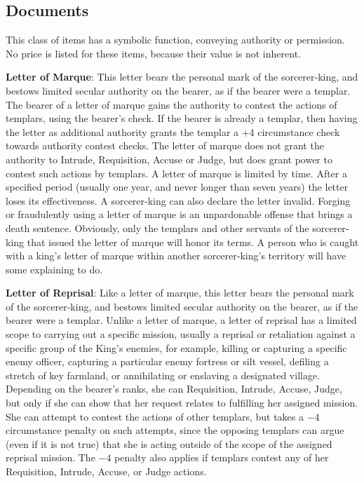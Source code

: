 \subsection{Documents}
This class of items has a symbolic function, conveying authority or permission. No price is listed for these items, because their value is not inherent.

\textbf{Letter of Marque}: This letter bears the personal mark of the sorcerer‐king, and bestows limited secular authority on the bearer, as if the bearer were a templar. The bearer of a letter of marque gains the authority to contest the actions of templars, using the bearer’s  check. If the bearer is already a templar, then having the letter as additional authority grants the templar a +4 circumstance check towards authority contest checks. The letter of marque does not grant the authority to Intrude, Requisition, Accuse or Judge, but does grant power to contest such actions by templars. A letter of marque is limited by time. After a specified period (usually one year, and never longer than seven years) the letter loses its effectiveness. A sorcerer‐king can also declare the letter invalid. Forging or fraudulently using a letter of marque is an unpardonable offense that brings a death sentence. Obviously, only the templars and other servants of the sorcerer‐king that issued the letter of marque will honor its terms. A person who is caught with a king’s letter of marque within another sorcerer‐king’s territory will have some explaining to do.

\textbf{Letter of Reprisal}: Like a letter of marque, this letter bears the personal mark of the sorcerer‐king, and bestows limited secular authority on the bearer, as if the bearer were a templar. Unlike a letter of marque, a letter of reprisal has a limited scope to carrying out a specific mission, usually a reprisal or retaliation against a specific group of the King’s enemies, for example, killing or capturing a specific enemy officer, capturing a particular enemy fortress or silt vessel, defiling a stretch of key farmland, or annihilating or enslaving a designated village. Depending on the bearer’s  ranks, she can Requisition, Intrude, Accuse, Judge, but only if she can show that her request relates to fulfilling her assigned mission. She can attempt to contest the actions of other templars, but takes a $-4$ circumstance penalty on such attempts, since the opposing templars can argue (even if it is not true) that she is acting outside of the scope of the assigned reprisal mission. The $-4$ penalty also applies if templars contest any of her Requisition, Intrude, Accuse, or Judge actions.